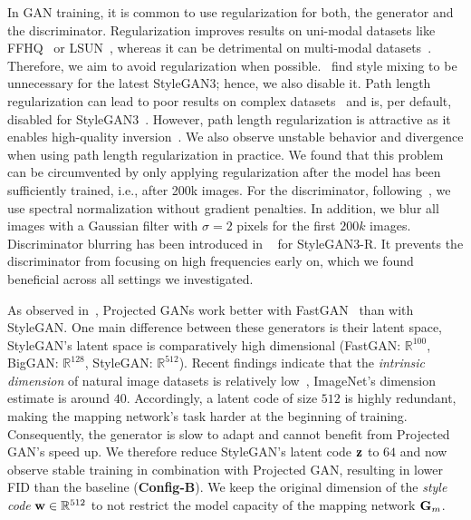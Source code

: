 In GAN training, it is common to use regularization for both, the generator and the discriminator. Regularization improves results on uni-modal datasets like FFHQ~\cite{Karras2019CVPR} or LSUN~\cite{Yu2015ARXIV}, whereas it can be detrimental on multi-modal datasets~\cite{Brock2019ICLR, Gwern2020MISC}. Therefore, we aim to avoid regularization when possible.~\cite{Karras2021NEURIPS} find style mixing to be unnecessary for the latest StyleGAN3; hence, we also disable it. Path length regularization can lead to poor results on complex datasets~\cite{Gwern2020MISC} and is, per default, disabled for StyleGAN3~\cite{Karras2021NEURIPS}. However, path length regularization is attractive as it enables high-quality inversion~\cite{Karras2020CVPR}. 
We also observe unstable behavior and divergence when using path length regularization in practice. We found that this problem can be circumvented by only applying regularization after the model has been sufficiently trained, i.e., after 200k images. For the discriminator, following~\cite{Sauer2021NEURIPS}, we use spectral normalization without gradient penalties. In addition, we blur all images with a Gaussian filter with $\sigma=2$ pixels for the first $200k$ images. Discriminator blurring has been introduced in ~\cite{Karras2021NEURIPS} for StyleGAN3-R. It prevents the discriminator from focusing on high frequencies early on, which we found beneficial across all settings we investigated. 
 
As observed in~\cite{Sauer2021NEURIPS}, Projected GANs work better with FastGAN~\cite{Liu2021ICLR} than with StyleGAN. One main difference between these generators is their latent space, StyleGAN's latent space is comparatively high dimensional 
(FastGAN: $\mathbb{R}^{100}$, BigGAN: $\mathbb{R}^{128}$, StyleGAN: $\mathbb{R}^{512}$). 
Recent findings indicate that the \textit{intrinsic dimension}  of natural image datasets is relatively low~\cite{Pope2021ICLR}, ImageNet's dimension estimate is around $40$. Accordingly, a latent code of size $512$ is highly redundant, making the mapping network's task harder at the beginning of training. Consequently, the generator is slow to adapt and cannot benefit from Projected GAN's speed up. We therefore reduce StyleGAN's latent code $\mathbf{z}$ to $64$ and now observe stable training in combination with Projected GAN, resulting in lower FID than the baseline (\textbf{Config-B}). We keep the original dimension of the \textit{style code} $\mathbf{w} \in \mathbb{R}^{512}$ to not restrict the model capacity of the mapping network $\mathbf{G}_m$.
 
